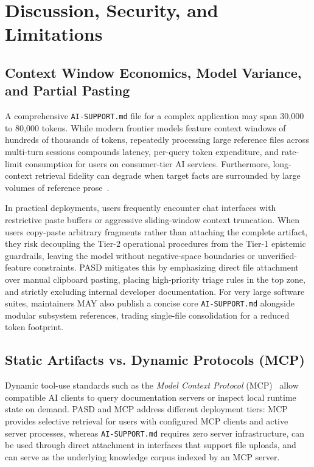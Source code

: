 \documentclass[12pt, a4paper]{article}
\begin{document}
\section{Discussion, Security, and Limitations}
\label{sec:discussion}

\subsection{Context Window Economics, Model Variance, and Partial Pasting}
A comprehensive \texttt{AI-SUPPORT.md} file for a complex application may span 30,000 to 80,000 tokens. While modern frontier models feature context windows of hundreds of thousands of tokens, repeatedly processing large reference files across multi-turn sessions compounds latency, per-query token expenditure, and rate-limit consumption for users on consumer-tier AI services. Furthermore, long-context retrieval fidelity can degrade when target facts are surrounded by large volumes of reference prose~\citep{liu2024lost}.

In practical deployments, users frequently encounter chat interfaces with restrictive paste buffers or aggressive sliding-window context truncation. When users copy-paste arbitrary fragments rather than attaching the complete artifact, they risk decoupling the Tier-2 operational procedures from the Tier-1 epistemic guardrails, leaving the model without negative-space boundaries or unverified-feature constraints. PASD mitigates this by emphasizing direct file attachment over manual clipboard pasting, placing high-priority triage rules in the top zone, and strictly excluding internal developer documentation. For very large software suites, maintainers MAY also publish a concise core \texttt{AI-SUPPORT.md} alongside modular subsystem references, trading single-file consolidation for a reduced token footprint.

\subsection{Static Artifacts vs. Dynamic Protocols (MCP)}
Dynamic tool-use standards such as the \textit{Model Context Protocol} (MCP)~\citep{anthropic2024mcp} allow compatible AI clients to query documentation servers or inspect local runtime state on demand. PASD and MCP address different deployment tiers: MCP provides selective retrieval for users with configured MCP clients and active server processes, whereas \texttt{AI-SUPPORT.md} requires zero server infrastructure, can be used through direct attachment in interfaces that support file uploads, and can serve as the underlying knowledge corpus indexed by an MCP server.
\end{document}

